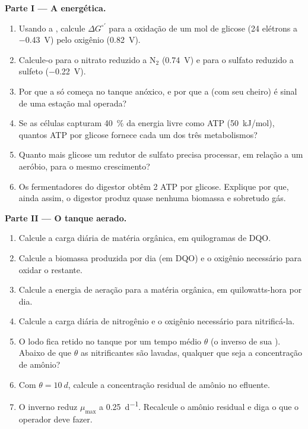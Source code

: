 \begin{problem}
\medskip
\noindent\textbf{Parte I --- A energética.}
\begin{enumerate}
  \item Usando a , calcule $\Delta G^{\circ\prime}$
        para a oxidação de um mol de glicose (24 elétrons a
        \qty{-0.43}{V}) pelo oxigênio (\qty{+0.82}{V}).
  \item Calcule-o para o nitrato reduzido a $\mathrm{N_2}$
        (\qty{+0.74}{V}) e para o sulfato reduzido a sulfeto
        (\qty{-0.22}{V}).
  \item Por que a  só começa no tanque anóxico, e por
        que a  (com seu cheiro) é sinal de uma
        estação mal operada?
  \item Se as células capturam \qty{40}{\%} da energia livre como ATP
        (\qty{50}{kJ/mol}), quantos ATP por glicose fornece cada um dos
        três metabolismos?
  \item Quanto mais glicose um redutor de sulfato precisa processar,
        em relação a um aeróbio, para o mesmo crescimento?
  \item Os fermentadores do digestor obtêm 2 ATP por glicose. Explique
        por que, ainda assim, o digestor produz quase nenhuma biomassa
        e sobretudo gás.
\end{enumerate}

\medskip
\noindent\textbf{Parte II --- O tanque aerado.}
\begin{enumerate}[resume]
  \item Calcule a carga diária de matéria orgânica, em quilogramas de
        DQO.
  \item Calcule a biomassa produzida por dia (em DQO) e o oxigênio
        necessário para oxidar o restante.
  \item Calcule a energia de aeração para a matéria orgânica, em
        quilowatts-hora por dia.
  \item Calcule a carga diária de nitrogênio e o oxigênio necessário
        para nitrificá-la.
  \item O lodo fica retido no tanque por um tempo médio $\theta$
        (o inverso de sua ). Abaixo de que $\theta$ as
        nitrificantes são lavadas, qualquer que seja a concentração de
        amônio?
  \item Com $\theta = \qty{10}{d}$, calcule a concentração residual
        de amônio no efluente.
  \item O inverno reduz $\mu_{\max}$ a \qty{0.25}{d^{-1}}. Recalcule
        o amônio residual e diga o que o operador deve fazer.
\end{enumerate}


\end{problem}
